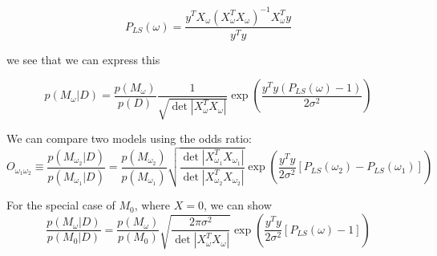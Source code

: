 \documentclass[12pt,pdftex]{article}
\begin{document}
\begin{equation}
  P_{LS}(\omega) = \frac{y^TX_\omega(X_\omega^TX_\omega)^{-1}X_\omega^Ty}{y^Ty}
\end{equation}

we see that we can express this

\begin{equation}
  p(M_\omega|D) = \frac{p(M_\omega)}{p(D)}\frac{1}{\sqrt{\det|X_\omega^TX_\omega|}}
  \exp\left(\frac{y^Ty(P_{LS}(\omega) - 1)}{2\sigma^2}\right)
\end{equation}

We can compare two models using the odds ratio:
\begin{equation}
  O_{\omega_1\omega_2} \equiv \frac{p(M_{\omega_2}|D)}{p(M_{\omega_1}|D)}
  =\frac{p(M_{\omega_2})}{p(M_{\omega_1})}\sqrt{\frac{\det|X_{\omega_1}^TX_{\omega_1}|}{\det|X_{\omega_2}^TX_{\omega_2}|}}\exp\left(\frac{y^Ty}{2\sigma^2}\left[P_{LS}(\omega_2) - P_{LS}(\omega_1)\right]\right)
\end{equation}

For the special case of $M_0$, where $X = 0$, we can show
\begin{equation}
\frac{p(M_{\omega}|D)}{p(M_0|D)} =
\frac{p(M_{\omega})}{p(M_0)}\sqrt{\frac{2\pi\sigma^2}{\det|X_\omega^TX_\omega|}}\exp\left(\frac{y^Ty}{2\sigma^2}\left[P_{LS}(\omega) - 1\right]\right)
\end{equation}
\end{document}
